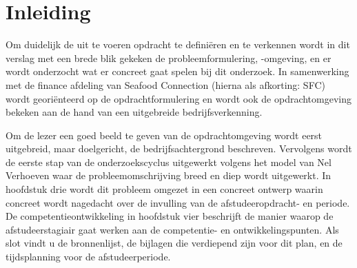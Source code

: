 \chapter*{Inleiding}
Om duidelijk de uit te voeren opdracht te definiëren en te verkennen wordt in dit verslag met een brede blik gekeken de probleemformulering, -omgeving, en er wordt onderzocht wat er concreet gaat spelen bij dit onderzoek. In samenwerking met de finance afdeling van Seafood Connection (hierna als afkorting: SFC) wordt georiënteerd op de opdrachtformulering en wordt ook de opdrachtomgeving bekeken aan de hand van een uitgebreide bedrijfsverkenning. 

Om de lezer een goed beeld te geven van de opdrachtomgeving wordt eerst uitgebreid, maar doelgericht, de bedrijfsachtergrond beschreven. Vervolgens wordt de eerste stap van de onderzoekscyclus uitgewerkt volgens het model van Nel Verhoeven waar de probleemomschrijving breed en diep wordt uitgewerkt. In hoofdstuk drie wordt dit probleem omgezet in een concreet ontwerp waarin concreet wordt nagedacht over de invulling van de afstudeeropdracht- en periode. De competentieontwikkeling in hoofdstuk vier beschrijft de manier waarop de afstudeerstagiair gaat werken aan de competentie- en ontwikkelingspunten. Als slot vindt u de bronnenlijst, de bijlagen die verdiepend zijn voor dit plan, en de tijdsplanning voor de afstudeerperiode. 